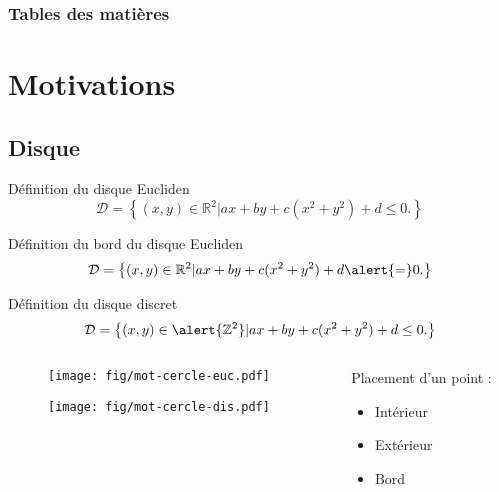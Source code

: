 \documentclass{beamer}
\begin{document}
\begin{frame}
  \frametitle{Tables des matières} %
  \setcounter{tocdepth}{1}
  \tableofcontents %
\end{frame}

\section{Motivations}

\subsection{Disque}
\begin{frame}
  {
    \begin{block}{Définition du disque Eucliden}
      $$\mathcal{D} =  \left\{ (x,y) \in \mathbb{R}^{2} |  ax + by + c(x^2 + y^2) + d \leq 0. \right\}$$
    \end{block}
  }
  {
    \begin{block}{Définition du bord du disque Eucliden}
      $$\mathcal{D} =  \left\{ (x,y) \in \mathbb{R}^{2} |  ax + by + c(x^2 + y^2) + d \alert{=} 0. \right\}$$
    \end{block}
  }  
  {
    \begin{block}{Définition du disque discret}
      $$\mathcal{D} =  \left\{ (x,y) \in \alert{\mathbb{Z}^{2}} |  ax + by + c(x^2 + y^2) + d \leq 0. \right\}$$
    \end{block}
  }
  \begin{columns}[t]
    \begin{column}{6cm}
      {
        \begin{figure}[h!]
          \centering
          \texttt{[image: fig/mot-cercle-euc.pdf]}
        \end{figure}
      }
      {
        \begin{figure}[h!]
          \centering
          \texttt{[image: fig/mot-cercle-dis.pdf]}
        \end{figure}
      }
      \end{column}
      \begin{column}{5cm}
        \vspace{-0.4cm}
        \begin{exampleblock}{Placement d'un point :}
          \begin{itemize}
            \item Intérieur
            \item Extérieur
            \item Bord
          \end{itemize}
        \end{exampleblock}


\end{column}
\end{columns}
\end{frame}
\end{document}

